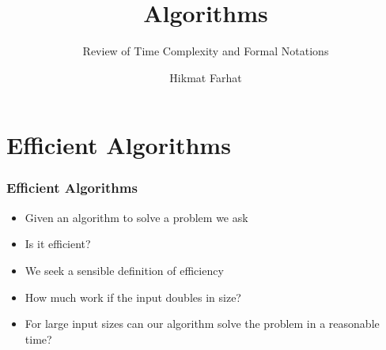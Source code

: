 \documentclass{beamer}
\title{Algorithms}
\subtitle{Review of Time Complexity and Formal Notations}
\author{Hikmat Farhat}
\begin{document}
\section{Efficient Algorithms}
\frame{\titlepage}


\begin{frame}
  \frametitle{Efficient Algorithms}

  \begin{itemize}
\item Given an algorithm to solve a problem we ask
\item Is it efficient?
\item We seek a sensible definition of efficiency
\item How much work if the input doubles in size?
\item For large input sizes can our algorithm solve the problem in a
  reasonable time?
  \end{itemize}
\end{frame}

\end{document}
